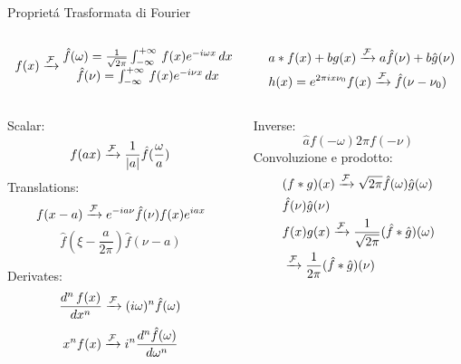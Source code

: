 \begin{wordonframe}{Propriet\'a Trasformata di Fourier}
\begin{columns}
\begin{column}{0.5\textwidth}
\begin{align*}
f(x)\xrightarrow{\mathcal{F}}{}\begin{matrix}
\hat{f}(\omega)=\frac{1}{\sqrt{2\pi}}\int_{-\infty}^{+\infty}\,f(x)e^{-i\omega x}\,dx\\
\hat{f}(\nu)=\int_{-\infty}^{+\infty}\,f(x)e^{-i\nu x}\,dx\\
\end{matrix}
\end{align*}
\end{column}

\begin{column}{0.5\textwidth}
\begin{align*}
&a*f(x)+bg(x)\xrightarrow{\mathcal{F}}{}a\hat{f}(\nu)+b\hat{g}(\nu)\\
&h(x)=e^{2\pi ix\nu_0}f(x)\xrightarrow{\mathcal{F}}{}\hat{f}(\nu-\nu_0)
\end{align*}
\end{column}
\end{columns}

\begin{columns}
\begin{column}{0.5\textwidth}
Scalar: \[f(ax)\xrightarrow{\mathcal{F}}{}\frac{1}{|a|}\hat{f}(\frac{\omega}{a}) \]
Translations:
\[f(x-a)\xrightarrow{\mathcal{F}}{}e^{-ia\nu}\hat{f}(\nu)f(x)e^{iax}\]
\[\hat{f}(\xi-\frac{a}{2\pi}) \hat{f}(\nu-a)\]

Derivates:
\[\frac{d^n\,f(x)}{dx^n}\xrightarrow{\mathcal{F}}{}(i\omega)^n\hat{f}(\omega)\]
\[x^nf(x)\xrightarrow{\mathcal{F}}{}i^n\frac{d^n\hat{f}(\omega)}{d\omega^n}\]
\end{column}
\begin{column}{0.5\textwidth}
Inverse: \[\hat{a} f(-\omega) 2\pi f(-\nu)\]
Convoluzione e prodotto:
\begin{align*}
&(f*g)(x)\xrightarrow{\mathcal{F}}{}\sqrt{2\pi}\hat{f}(\omega)\hat{g}(\omega)\\
&\hat{f}(\nu)\hat{g}(\nu)\\
&f(x)g(x)\xrightarrow{\mathcal{F}}{}\frac{1}{\sqrt{2\pi}}(\hat{f}*\hat{g})(\omega)\\
&\xrightarrow{\mathcal{F}}{}\frac{1}{2\pi}(\hat{f}*\hat{g})(\nu)
\end{align*}

\end{column}
\end{columns}
\end{wordonframe}

